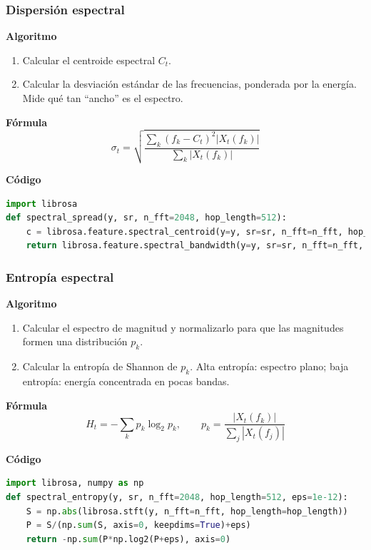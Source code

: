 \subsubsection{Dispersión espectral}
\textbf{Algoritmo} \parencite{tzanetakis2002musical, peeters2004large}
\begin{enumerate}
    \item Calcular el centroide espectral \(C_t\).
    \item Calcular la desviación estándar de las frecuencias, ponderada por la energía. Mide qué tan “ancho” es el espectro.
\end{enumerate}

\textbf{Fórmula}
\[
\sigma_t=\sqrt{\frac{\sum_k (f_k-C_t)^2|X_t(f_k)|}{\sum_k|X_t(f_k)|}}
\]

\textbf{Código}
\begin{lstlisting}[language=Python, label={lst:spread_code}, caption={Dispersión espectral}]
import librosa
def spectral_spread(y, sr, n_fft=2048, hop_length=512):
    c = librosa.feature.spectral_centroid(y=y, sr=sr, n_fft=n_fft, hop_length=hop_length)
    return librosa.feature.spectral_bandwidth(y=y, sr=sr, n_fft=n_fft, hop_length=hop_length, centroid=c, p=2)[0]
\end{lstlisting}

\subsubsection{Entropía espectral}
\textbf{Algoritmo} \parencite{peeters2004large, muller2015fmp}
\begin{enumerate}
    \item Calcular el espectro de magnitud y normalizarlo para que las magnitudes formen una distribución \(p_k\).
    \item Calcular la entropía de Shannon de \(p_k\). Alta entropía: espectro plano; baja entropía: energía concentrada en pocas bandas.
\end{enumerate}

\textbf{Fórmula}
\[
H_t=-\sum_{k} p_k\log_2 p_k,\qquad p_k=\frac{|X_t(f_k)|}{\sum_{j}|X_t(f_j)|}
\]

\textbf{Código}
\begin{lstlisting}[language=Python, label={lst:spec_entropy}, caption={Entropía espectral}]
import librosa, numpy as np
def spectral_entropy(y, sr, n_fft=2048, hop_length=512, eps=1e-12):
    S = np.abs(librosa.stft(y, n_fft=n_fft, hop_length=hop_length))
    P = S/(np.sum(S, axis=0, keepdims=True)+eps)
    return -np.sum(P*np.log2(P+eps), axis=0)
\end{lstlisting}

